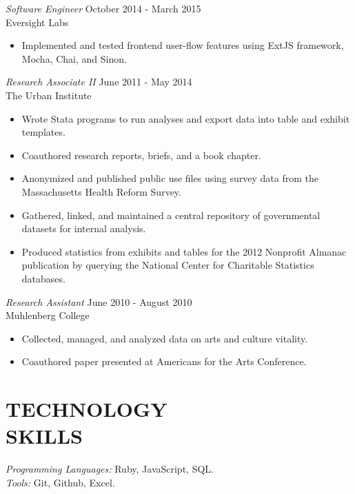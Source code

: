 \documentclass[margin, 10pt]{res} %
\begin{document}
\begin{resume}
{\sl Software Engineer} \hfill October 2014 - March 2015 \\
Eversight Labs
\begin{itemize} \itemsep -2pt %
\item Implemented and tested frontend user-flow features using ExtJS framework, Mocha, Chai, and Sinon.
\end{itemize}

{\sl  Research Associate II } \hfill June 2011 - May 2014\\
The Urban Institute
\begin{itemize} \itemsep -2pt %
\item Wrote Stata programs to run analyses and export data into table and exhibit templates.
\item Coauthored research reports, briefs, and a book chapter.
\item Anonymized and published public use files using survey data from the Massachusetts Health Reform Survey.
\item Gathered, linked, and maintained a central repository of governmental datasets for internal analysis.
\item Produced statistics from exhibits and tables for the 2012 Nonprofit Almanac publication by querying the National Center for Charitable Statistics databases.
\end{itemize}

{\sl Research Assistant } \hfill June 2010 - August 2010 \\
Muhlenberg College
\begin{itemize} \itemsep -2pt %
\item Collected, managed, and analyzed data on arts and culture vitality.
\item Coauthored paper presented at Americans for the Arts Conference.
\end{itemize}


\section{TECHNOLOGY \\ SKILLS}

{\sl Programming Languages:} Ruby, JavaScript, SQL. \\
{\sl Tools:} Git, Github, Excel. \\


\end{resume}
\end{document}
